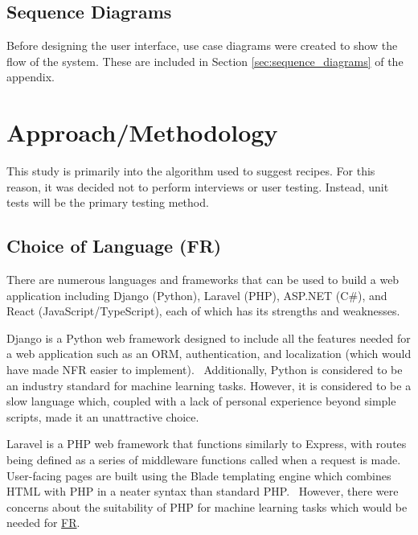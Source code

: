 \subsection{Sequence Diagrams}

Before designing the user interface, use case diagrams were created to show the flow of the system. These are included in Section \ref{sec:sequence_diagrams}
of the appendix.

\section{Approach/Methodology}\label{sec:approach_methodology}

This study is primarily into the algorithm used to suggest recipes. For this reason,
it was decided not to perform interviews or user testing. Instead, unit tests will
be the primary testing method.

\subsection{Choice of Language (FR)}\label{sec:language}

There are numerous languages and frameworks that can be used to build a web application including
Django (Python), Laravel (PHP), ASP.NET (C\#), and React (JavaScript/TypeScript), each of which has
its strengths and weaknesses.

Django is a Python web framework designed to include all the features needed for a web application such
as an ORM, authentication, and localization (which would have made NFR
easier to implement).~\cite{ghimire_comparative_2020} Additionally, Python is considered to be an
industry standard for machine learning tasks. However, it is considered to be a slow language\cite{srinath_pythonfastest_2017}
which, coupled with a lack of personal experience beyond simple scripts, made it an unattractive choice.

Laravel is a PHP web framework that functions similarly to Express, with routes being defined as a series of
middleware functions called when a request is made. User-facing pages are built using the Blade templating engine
which combines HTML with PHP in a neater syntax than standard PHP.~\cite{nguyen_building_2015,he_design_2015}
However, there were concerns about the suitability of PHP for machine learning tasks which would be needed for
\hyperref[req:similar_recipes]{FR}.


